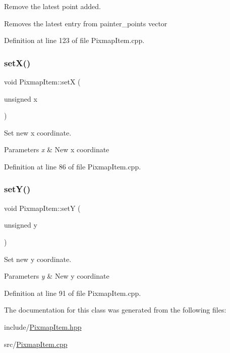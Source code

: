 Remove the latest point added. 

Removes the latest entry from painter\+\_\+points vector 

Definition at line 123 of file Pixmap\+Item.\+cpp.

\mbox{\label{classPixmapItem_a692a0aca72ffbe102769fdc9246ed2f6}} 
\subsubsection{\texorpdfstring{set\+X()}{setX()}}
{\footnotesize\ttfamily void Pixmap\+Item\+::setX (\begin{DoxyParamCaption}\item[{unsigned}]{x }\end{DoxyParamCaption})}



Set new x coordinate. 


\begin{DoxyParams}{Parameters}
{\em x} & New x coordinate \\
\hline
\end{DoxyParams}


Definition at line 86 of file Pixmap\+Item.\+cpp.

\mbox{\label{classPixmapItem_a6c6f4a872823f585edcf134d9bf209e1}} 
\subsubsection{\texorpdfstring{set\+Y()}{setY()}}
{\footnotesize\ttfamily void Pixmap\+Item\+::setY (\begin{DoxyParamCaption}\item[{unsigned}]{y }\end{DoxyParamCaption})}



Set new y coordinate. 


\begin{DoxyParams}{Parameters}
{\em y} & New y coordinate \\
\hline
\end{DoxyParams}


Definition at line 91 of file Pixmap\+Item.\+cpp.



The documentation for this class was generated from the following files\+:\begin{DoxyCompactItemize}
\item 
include/\mbox{\hyperlink{PixmapItem_8hpp}{Pixmap\+Item.\+hpp}}\item 
src/\mbox{\hyperlink{PixmapItem_8cpp}{Pixmap\+Item.\+cpp}}\end{DoxyCompactItemize}
